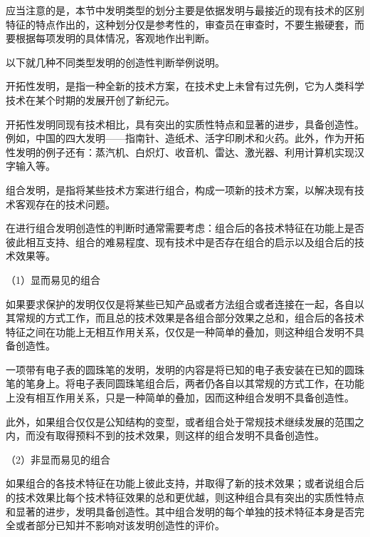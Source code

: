应当注意的是，本节中发明类型的划分主要是依据发明与最接近的现有技术的区别特征的特点作出的，这种划分仅是参考性的，审查员在审查时，不要生搬硬套，而要根据每项发明的具体情况，客观地作出判断。

以下就几种不同类型发明的创造性判断举例说明。

开拓性发明，是指一种全新的技术方案，在技术史上未曾有过先例，它为人类科学技术在某个时期的发展开创了新纪元。

开拓性发明同现有技术相比，具有突出的实质性特点和显著的进步，具备创造性。例如，中国的四大发明——指南针、造纸术、活字印刷术和火药。此外，作为开拓性发明的例子还有：蒸汽机、白炽灯、收音机、雷达、激光器、利用计算机实现汉字输入等。

组合发明，是指将某些技术方案进行组合，构成一项新的技术方案，以解决现有技术客观存在的技术问题。

在进行组合发明创造性的判断时通常需要考虑：组合后的各技术特征在功能上是否彼此相互支持、组合的难易程度、现有技术中是否存在组合的启示以及组合后的技术效果等。

{\setlength{\parindent}{17.1bp}（1）显而易见的组合\par}

如果要求保护的发明仅仅是将某些已知产品或者方法组合或者连接在一起，各自以其常规的方式工作，而且总的技术效果是各组合部分效果之总和，组合后的各技术特征之间在功能上无相互作用关系，仅仅是一种简单的叠加，则这种组合发明不具备创造性。

{\par}

一项带有电子表的圆珠笔的发明，发明的内容是将已知的电子表安装在已知的圆珠笔的笔身上。将电子表同圆珠笔组合后，两者仍各自以其常规的方式工作，在功能上没有相互作用关系，只是一种简单的叠加，因而这种组合发明不具备创造性。

此外，如果组合仅仅是公知结构的变型，或者组合处于常规技术继续发展的范围之内，而没有取得预料不到的技术效果，则这样的组合发明不具备创造性。

{\setlength{\parindent}{17.1bp}（2）非显而易见的组合\par}

如果组合的各技术特征在功能上彼此支持，并取得了新的技术效果；或者说组合后的技术效果比每个技术特征效果的总和更优越，则这种组合具有突出的实质性特点和显著的进步，发明具备创造性。其中组合发明的每个单独的技术特征本身是否完全或者部分已知并不影响对该发明创造性的评价。

